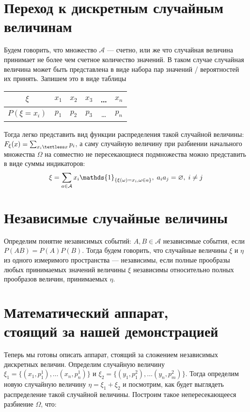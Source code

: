 \documentclass{article}
\begin{document}
    \section{Переход к дискретным случайным величинам}
        Будем говорить, что множество $\mathcal{A}$ — счетно, или же что случайная величина принимает не более чем счетное количество значений. В таком случае случайная величина может быть представлена в виде набора пар значений / вероятностей их принять. Запишем это в виде таблицы 

        \begin{center}
            \begin{tabular}{ c|c|c|c|c|c } 
                 $\xi$ & $x_1$ & $x_2$ & $x_3$ & \ldots & $x_n$\\
                 \hline
                 $P(\xi = x_i)$ & $p_1$ & $p_2$ & $p_3$ & \ldots & $p_n$ \\
            \end{tabular}
        \end{center}

        Тогда легко представить вид функции распределения такой случайной величины: $F_{\xi}(x) = \sum_{x_i \textless x}p_i$, а саму случайную величину при разбиении начального множества $\Omega$ на совместно не пересекающиеся подмножества можно представить в виде суммы индикаторов: $$\xi = \sum_{a \in \mathcal{A}}{x_i \mathds{1}_{\{\xi(\omega) = x_i, \omega \in a\}}}, \hspace{0.1cm} a_ia_j = \varnothing, \hspace{0.1cm} i \neq j$$

\section{Независимые случайные величины}
    Определим понятие независимых событий: $A, B \in \mathcal{A}$ независимые события, если $P(AB)=P(A)P(B)$. Тогда будем говорить, что случайные величины $\xi$ и $\eta$ из одного измеримого пространства — независимы, если полные прообразы любых принимаемых значений величины $\xi$ независимы относительно полных прообразов величин, принимаемых $\eta$. 

\section{Математический аппарат,\\ стоящий за нашей демонстрацией}
    Теперь мы готовы описать аппарат, стоящий за сложением независимых дискретных величин. Определим случайную величину $\xi_1 = \{(x_1, p_1^1), \ldots (x_n, p_n^1)\}$ и $\xi_2 = \{(y_1, p_1^2), \ldots (y_n, p_m^2)\}$. Тогда определим новую случайную величину $\eta = \xi_1 + \xi_2$ и посмотрим, как будет выглядеть распределение такой случайной величины. Построим такое непересекающееся разбиение $\Omega$, что:
\end{document}
